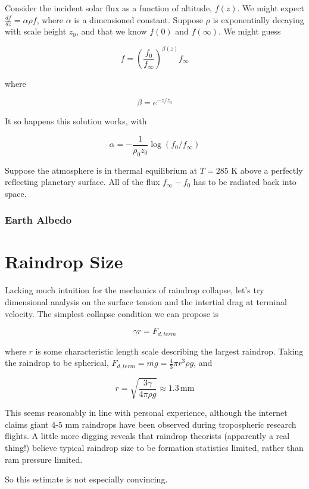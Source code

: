 \documentclass[12pt]{article}
\begin{document}
Consider the incident solar flux as a function of altitude, \(f(z)\). We might expect \(\frac{df}{dz} = \alpha \rho f\), where \(\alpha\) is a dimensioned constant. Suppose \(\rho\) is exponentially decaying with scale height \(z_0\), and that we know \(f(0)\) and \(f(\infty)\). We might guess

\[ f = \left( \frac{f_0}{f_\infty} \right)^{\beta(z)}f_{\infty}
\]

where

\[ \beta = e^{-z/z_0}
\]

It so happens this solution works, with

\[\alpha = -\frac{1}{\rho_0 z_0}\log(f_0/f_\infty)
\]

Suppose the atmosphere is in thermal equilibrium at \(T = 285\) K above a perfectly reflecting planetary surface. All of the flux \(f_\infty - f_0\) has to be radiated back into space.

\subsubsection{Earth Albedo}



\section{Raindrop Size}

Lacking much intuition for the mechanics of raindrop collapse, let's try dimensional analysis on the surface tension and the intertial drag at terminal velocity. The simplest collapse condition we can propose is 

\[ \gamma r = F_{d,term}
\]

where \(r\) is some characteristic length scale describing the largest raindrop. Taking the raindrop to be spherical, \(F_{d,term} = mg = \frac{4}{3}\pi r^3 \rho g\), and

\[ r = \sqrt{\frac{3\gamma}{4\pi\rho g}} \approx 1.3 \, \mathrm{mm}
\]

This seems reasonably in line with personal experience, although the internet claims giant 4-5 mm raindrops have been observed during tropospheric research flights. A little more digging reveals that raindrop theorists (apparently a real thing!) believe typical raindrop size to be formation statistics limited, rather than ram pressure limited.

So this estimate is not especially convincing. 
\end{document}
